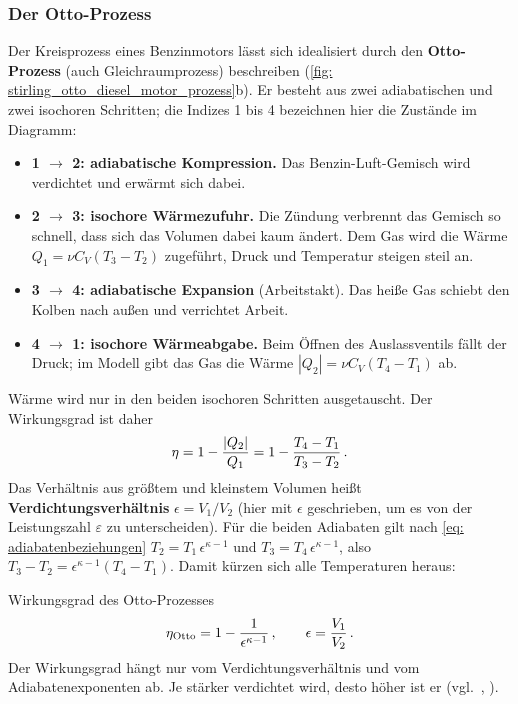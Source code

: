 \subsubsection{Der Otto-Prozess}\label{subsubsec: otto_prozess}
Der Kreisprozess eines Benzinmotors lässt sich idealisiert durch den \textbf{Otto-Prozess} (auch Gleichraumprozess) beschreiben (\cref{fig: stirling_otto_diesel_motor_prozess}b). Er besteht aus zwei adiabatischen und zwei isochoren Schritten; die Indizes 1 bis 4 bezeichnen hier die Zustände im Diagramm:
\begin{itemize}[itemsep=1.5pt]
    \item \textbf{1 $\to$ 2: adiabatische Kompression.} Das Benzin-Luft-Gemisch wird verdichtet und erwärmt sich dabei.
    \item \textbf{2 $\to$ 3: isochore Wärmezufuhr.} Die Zündung verbrennt das Gemisch so schnell, dass sich das Volumen dabei kaum ändert. Dem Gas wird die Wärme $Q_1 = \nu C_V (T_3 - T_2)$ zugeführt, Druck und Temperatur steigen steil an.
    \item \textbf{3 $\to$ 4: adiabatische Expansion} (Arbeitstakt). Das heiße Gas schiebt den Kolben nach außen und verrichtet Arbeit.
    \item \textbf{4 $\to$ 1: isochore Wärmeabgabe.} Beim Öffnen des Auslassventils fällt der Druck; im Modell gibt das Gas die Wärme $|Q_2| = \nu C_V (T_4 - T_1)$ ab.
\end{itemize}
Wärme wird nur in den beiden isochoren Schritten ausgetauscht. Der Wirkungsgrad ist daher
\begin{equation*}
    \eta = 1 - \frac{|Q_2|}{Q_1} = 1 - \frac{T_4 - T_1}{T_3 - T_2} \,.
\end{equation*}
Das Verhältnis aus größtem und kleinstem Volumen heißt \textbf{Verdichtungsverhältnis} $\epsilon = V_1/V_2$ (hier mit $\epsilon$ geschrieben, um es von der Leistungszahl $\varepsilon$ zu unterscheiden). Für die beiden Adiabaten gilt nach \cref{eq: adiabatenbeziehungen} $T_2 = T_1\, \epsilon^{\kappa - 1}$ und $T_3 = T_4\, \epsilon^{\kappa - 1}$, also $T_3 - T_2 = \epsilon^{\kappa - 1} (T_4 - T_1)$. Damit kürzen sich alle Temperaturen heraus:
\begin{rememberbox}{Wirkungsgrad des Otto-Prozesses}
    \begin{equation}\label{eq: otto_wirkungsgrad}
        \eta_\text{Otto} = 1 - \frac{1}{\epsilon^{\kappa - 1}} \,{,}\, \qquad \epsilon = \frac{V_1}{V_2} \,.
    \end{equation}
    Der Wirkungsgrad hängt nur vom Verdichtungsverhältnis und vom Adiabatenexponenten ab. Je stärker verdichtet wird, desto höher ist er (vgl.~\cite[S.~703]{Giancoli2010}, \cite[S.~605]{Tipler2015}).
\end{rememberbox}

